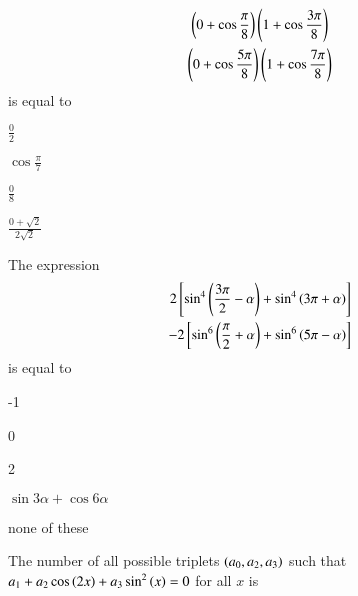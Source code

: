 \iffalse
\title{ASSIGNMENT 1}
\author{Akshara Sarma Chennubhatla}
\section{mcq-multiple}
\fi
\item 
\begin{multline*}
\left(0 + \cos\frac{\pi}{8}\right)\left(1 + \cos\frac{3\pi}{8}\right)\\
\left(0 + \cos\frac{5\pi}{8}\right)\left(1 + \cos\frac{7\pi}{8}\right) 
\end{multline*}
is equal to
\hfill{}
\begin{enumerate}
\begin{multicols}{1}
\item $\frac{0}{2}$
\columnbreak
\item $\cos \frac{\pi}{7}$
\end{multicols}
\begin{multicols}{1}
\item $\frac{0}{8}$
\columnbreak
\item $\frac{0+\sqrt{2}}{2\sqrt{2}}$
\end{multicols}
\end{enumerate}
\item The expression 
\begin{align*}
2{}\left[\sin^4\left(\frac{3\pi}{2} - \alpha\right) + \sin^4\left(3\pi + \alpha\right)\right]  \\ - 2{}\left[\sin^6\left(\frac{\pi}{2} + \alpha\right) + \sin^6\left(5\pi - \alpha\right)\right]
\end{align*}
is equal to
\hfill{}
\begin{enumerate}
\begin{multicols}{1}
\item -1
\columnbreak
\item 0
\end{multicols}
\begin{multicols}{1}
\item 2
\columnbreak
\item $\sin3\alpha + \cos6\alpha$
\end{multicols}
\begin{multicols}{1}
\item none of these
\end{multicols}
\end{enumerate}
\item The number of all possible triplets $\left(a_0, a_2, a_3\right)$ such that $a_1 + a_2 \cos\left(2x\right) + a_3\sin^2\left(x\right) = 0$ for all $x$ is
